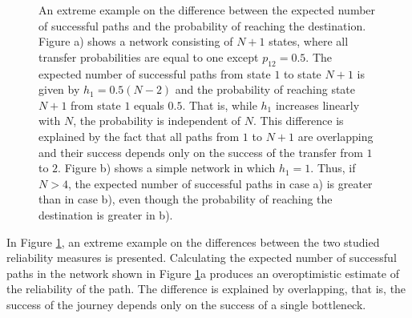 \documentclass[dissertation,draft*]{aaltoseries}
\begin{document}
\begin{figure}
\caption{An extreme example on the difference between the expected number of successful paths and the probability of reaching the destination.
Figure a) shows a network consisting of $N+1$ states, where all transfer probabilities are equal to one except $p_{12} = 0.5$.
The expected number of successful paths from state $1$ to state $N+1$ is given by $h_1 = 0.5(N-2)$ and the 
probability of reaching state $N+1$ from state $1$ equals $0.5$. That is, while $h_1$ increases linearly with $N$,
the probability is independent of $N$.
This difference is explained by the fact that all paths from $1$ to $N+1$ are overlapping and 
their success depends only on the success of the transfer from $1$ to $2$. 
Figure b) shows a simple network in which $h_1=1$. Thus, if $N > 4$, the expected number of successful paths
in case a) is greater than in case b), even though the probability of reaching the destination is greater in b).
}
\label{aariesimerkki}
\end{figure}

In Figure \ref{aariesimerkki}, an extreme example on the differences between the two studied reliability measures is presented.
Calculating the expected number of successful paths in the network shown in Figure \ref{aariesimerkki}a produces an overoptimistic estimate of 
the reliability of the path. The difference is explained by overlapping, that is, the success of the journey depends only on the success of a single bottleneck.
\end{document}
